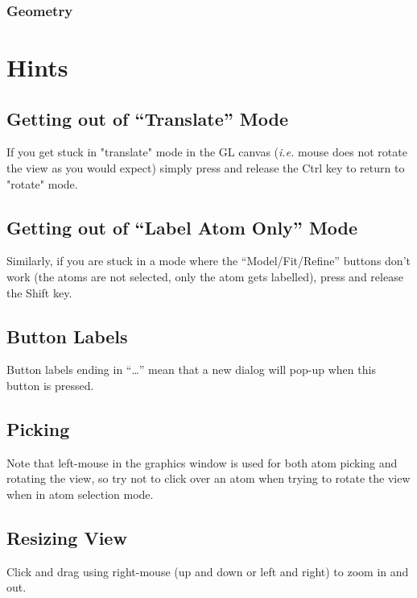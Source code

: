 \documentclass{book}
\begin{document}
\subsection{Geometry}


\chapter{Hints}
\label{chap-hints}
\section{Getting out of ``Translate'' Mode}
If you get stuck in "translate" mode in the GL canvas
(\emph{i.e.} mouse does not rotate the view as you would expect) simply
press and release the Ctrl key to return to "rotate" mode.

\section{Getting out of ``Label Atom Only'' Mode}
Similarly, if you are stuck in a mode where the ``Model/Fit/Refine''
buttons don't work (the atoms are not selected, only the atom gets
labelled), press and release the Shift key.

\section{Button Labels}
Button labels ending in ``\ldots'' mean that a new dialog will pop-up
when this button is pressed.

\section{Picking}
\label{sec:picking} Note that left-mouse in the 
graphics window is used for both atom picking and rotating the view,
so try not to click over an atom when trying to rotate the view when
in atom selection mode.  

%

\section{Resizing View}
 Click and drag using right-mouse (up
and down or left and right) to zoom in and out.
\end{document}
